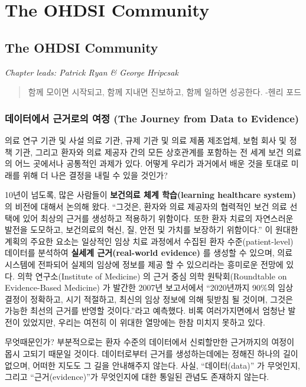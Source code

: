 \documentclass[11pt]{book}
\theoremstyle{definition}
\theoremstyle{definition}
\theoremstyle{definition}
\theoremstyle{remark}
\begin{document}
\mainmatter

\part{The OHDSI Community}\label{part-the-ohdsi-community}

\chapter{The OHDSI Community}\label{OhdsiCommunity}

\emph{Chapter leads: Patrick Ryan \& George Hripcsak}

\begin{quote}
함께 모이면 시작되고, 함께 지내면 진보하고, 함께 일하면 성공한다. -헨리
포드
\end{quote}

\section{데이터에서 근거로의 여정 (The Journey from Data to
Evidence)}\label{---the-journey-from-data-to-evidence}

의료 연구 기관 및 사설 의료 기관, 규제 기관 및 의료 제품 제조업체, 보험
회사 및 정책 기관, 그리고 환자와 의료 제공자 간의 모든 상호관계를
포함하는 전 세계 보건 의료의 어느 곳에서나 공통적인 과제가 있다. 어떻게
우리가 과거에서 배운 것을 토대로 미래를 위해 더 나은 결정을 내릴 수 있을
것인가?

10년이 넘도록, 많은 사람들이 \textbf{보건의료 체계 학습(learning
healthcare system)} 의 비전에 대해서 논의해 왔다. ``그것은, 환자와 의료
제공자의 협력적인 보건 의료 선택에 있어 최상의 근거를 생성하고 적용하기
위함이다. 또한 환자 치료의 자연스러운 발전을 도모하고, 보건의료의 혁신,
질, 안전 및 가치를 보장하기 위함이다.'' \citep{olsen2007learning} 이
원대한 계획의 주요한 요소는 일상적인 임상 치료 과정에서 수집된 환자
수준(patient-level) 데이터를 분석하여 \textbf{실세계 근거(real-world
evidence)} 를 생성할 수 있으며, 의료 시스템에 전파되어 실제의 임상에
정보를 제공 할 수 있으리라는 흥미로운 전망에 있다. 의학 연구소(Institute
of Medicine) 의 근거 중심 의학 원탁회(Roundtable on Evidence-Based
Medicine) 가 발간한 2007년 보고서에서 ``2020년까지 90\%의 임상 결정이
정확하고, 시기 적절하고, 최신의 임상 정보에 의해 뒷받침 될 것이며,
그것은 가능한 최선의 근거를 반영할 것이다.''라고 예측했다.
\citep{olsen2007learning} 비록 여러가지면에서 엄청난 발전이 있었지만,
우리는 여전히 이 위대한 열망에는 한참 미치지 못하고 있다.

무엇때문인가? 부분적으로는 환자 수준의 데이터에서 신뢰할만한 근거까지의
여정이 몹시 고되기 때문일 것이다. 데이터로부터 근거를 생성하는데에는
정해진 하나의 길이 없으며, 어떠한 지도도 그 길을 안내해주지 않는다.
사실, ``데이터(data)'' 가 무엇인지, 그리고 ``근거(evidence)''가
무엇인지에 대한 통일된 관념도 존재하지 않는다.
\end{document}
